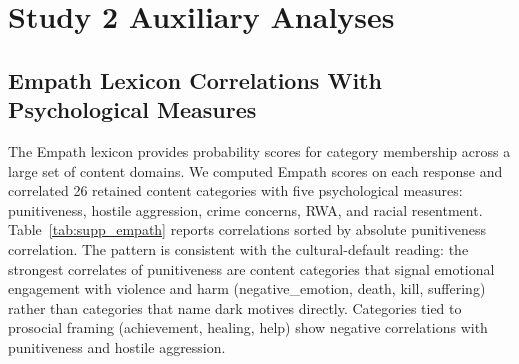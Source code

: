 \section{Study 2 Auxiliary Analyses}
\label{sec:supp_nlp_aux}

\subsection{Empath Lexicon Correlations With Psychological Measures}
\label{sec:supp_empath}

The Empath lexicon \citep{fast2016empath} provides probability scores for category membership across a large set of content domains. We computed Empath scores on each response and correlated 26 retained content categories with five psychological measures: punitiveness, hostile aggression, crime concerns, RWA, and racial resentment. Table~\ref{tab:supp_empath} reports correlations sorted by absolute punitiveness correlation. The pattern is consistent with the cultural-default reading: the strongest correlates of punitiveness are content categories that signal emotional engagement with violence and harm (negative\_emotion, death, kill, suffering) rather than categories that name dark motives directly. Categories tied to prosocial framing (achievement, healing, help) show negative correlations with punitiveness and hostile aggression.

